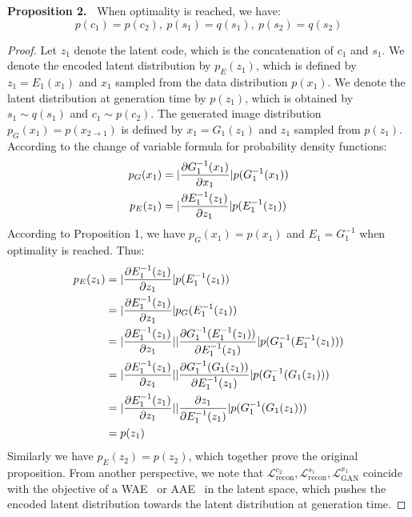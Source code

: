 \documentclass[runningheads]{llncs}
\newcommand{\oneshot}[2]{\noindent\textbf{Proposition {#1}.\ }{#2}}
\begin{document}
\oneshot{2}{\vspace{-0.1in}
	When optimality is reached, we have:
	\label{proposition:2}
	$$p(c_{1})=p(c_{2}),\ p(s_{1})=q(s_{1}),\ p(s_{2})=q(s_{2})$$	
}
\begin{proof}
		Let $z_{1}$ denote the latent code, which is the concatenation of $c_{1}$ and $s_{1}$. We denote the encoded latent distribution by $p_{E}(z_{1})$, which is defined by $z_{1}=E_{1}(x_{1})$ and $x_{1}$ sampled from the data distribution $p(x_{1})$. We denote the latent distribution at generation time by $p(z_{1})$, which is obtained by $s_{1}\sim q(s_{1})$ and $c_{1}\sim p(c_{2})$. The generated image distribution $p_{G}(x_{1})=p(x_{2\rightarrow 1})$ is defined by $x_{1} = G_{1}(z_{1})$ and $z_{1}$ sampled from $p(z_{1})$. According to the change of variable formula for probability density functions:
		\begin{align}
		p_{G}(x_{1}) &= \lvert\frac{\partial G_{1}^{-1}(x_{1})}{\partial x_{1}} \rvert p(G^{-1}_{1}(x_{1}))\notag\\
		p_{E}(z_{1}) &= \lvert\frac{\partial E_{1}^{-1}(z_{1})}{\partial z_{1}} \rvert p(E_{1}^{-1}(z_{1}))\notag
		\end{align}
		According to Proposition 1, we have $p_{G}(x_{1})=p(x_{1})$ and $E_{1}=G^{-1}_{1}$ when optimality is reached. Thus:
		\begin{align}
		p_{E}(z_{1}) &= \lvert\frac{\partial E_{1}^{-1}(z_{1})}{\partial z_{1}} \rvert p(E_{1}^{-1}(z_{1}))\notag\\
		&= \lvert\frac{\partial E_{1}^{-1}(z_{1})}{\partial z_{1}} \rvert p_{G}(E_{1}^{-1}(z_{1}))\notag\\
		&= \lvert\frac{\partial E_{1}^{-1}(z_{1})}{\partial z_{1}} \rvert  \lvert\frac{\partial G_{1}^{-1}(E_{1}^{-1}(z_{1}))}{\partial E_{1}^{-1}(z_{1})} \rvert	p(G^{-1}_{1}(E_{1}^{-1}(z_{1})))\notag\\
		&= \lvert\frac{\partial E_{1}^{-1}(z_{1})}{\partial z_{1}} \rvert \lvert\frac{\partial G_{1}^{-1}(G_{1}(z_{1}))}{\partial E_{1}^{-1}(z_{1})} \rvert 	p(G^{-1}_{1}(G_{1}(z_{1})))\notag\\
		&= \lvert\frac{\partial E_{1}^{-1}(z_{1})}{\partial z_{1}} \rvert \lvert\frac{\partial z_{1}}{\partial E_{1}^{-1}(z_{1})} \rvert 	p(G^{-1}_{1}(G_{1}(z_{1})))\notag\\
		&= p(z_{1})\notag
		\end{align}
		Similarly we have $p_{E}(z_{2})=p(z_{2})$, which together prove the original proposition. From another perspective, we note that $\mathcal{L}^{c_{2}}_{\text{recon}}, \mathcal{L}^{s_{1}}_{\text{recon}}, \mathcal{L}^{x_{1}}_{\text{GAN}}$ coincide with the objective of a WAE~\cite{tolstikhin2018wasserstein} or AAE~\cite{makhzani2015adversarial} in the latent space, which pushes the encoded latent distribution towards the latent distribution at generation time.
	\end{proof}
\end{document}
